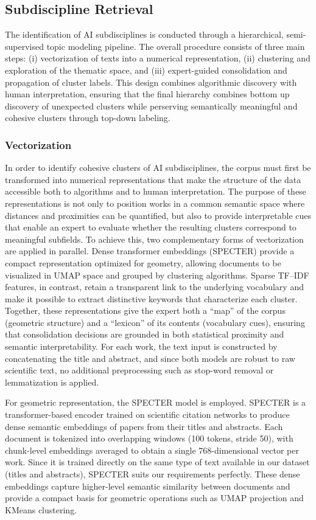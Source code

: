 \documentclass{article}
\begin{document}
\subsection{Subdiscipline Retrieval}


The identification of AI subdisciplines is conducted through a hierarchical, semi-supervised topic modeling pipeline. The overall procedure consists of three main steps: (i) vectorization of texts into a numerical representation, (ii) clustering and exploration of the thematic space, and (iii) expert-guided consolidation and propagation of cluster labels. This design combines algorithmic discovery with human interpretation, ensuring that the final hierarchy combines bottom up discovery of unexpected clusters while perserving semantically meaningful and cohesive clusters through top-down labeling.

\subsubsection{Vectorization}

In order to identify cohesive clusters of AI subdisciplines, the corpus must first be transformed into numerical representations that make the structure of the data accessible both to algorithms and to human interpretation. The purpose of these representations is not only to position works in a common semantic space where distances and proximities can be quantified, but also to provide interpretable cues that enable an expert to evaluate whether the resulting clusters correspond to meaningful subfields. To achieve this, two complementary forms of vectorization are applied in parallel. Dense transformer embeddings (SPECTER) provide a compact representation optimized for geometry, allowing documents to be visualized in UMAP space and grouped by clustering algorithms. Sparse TF–IDF features, in contrast, retain a transparent link to the underlying vocabulary and make it possible to extract distinctive keywords that characterize each cluster. Together, these representations give the expert both a “map” of the corpus (geometric structure) and a “lexicon” of its contents (vocabulary cues), ensuring that consolidation decisions are grounded in both statistical proximity and semantic interpretability. For each work, the text input is constructed by concatenating the title and abstract, and since both models are robust to raw scientific text, no additional preprocessing such as stop-word removal or lemmatization is applied. 

For geometric representation, the SPECTER model is employed. SPECTER is a transformer-based encoder trained on scientific citation networks to produce dense semantic embeddings of papers from their titles and abstracts. \cite{cohan2020specter} Each document is tokenized into overlapping windows (100 tokens, stride 50), with chunk-level embeddings averaged to obtain a single 768-dimensional vector per work. Since it is trained directly on the same type of text available in our dataset (titles and abstracts), SPECTER suits our requirements perfectly. These dense embeddings capture higher-level semantic similarity between documents and provide a compact basis for geometric operations such as UMAP projection and KMeans clustering.  
\end{document}
